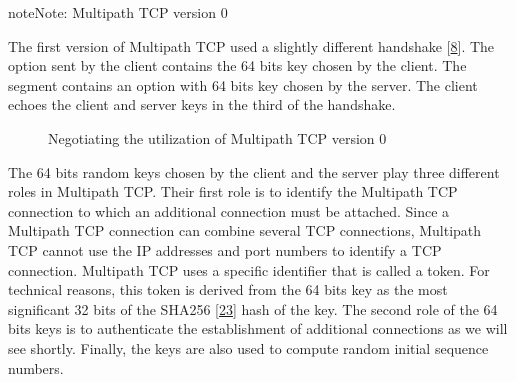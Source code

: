 \documentclass[letterpaper,10pt,english]{sphinxmanual}
\begin{document}
\begin{sphinxadmonition}{note}{Note:}
\sphinxAtStartPar
Multipath TCP version 0

\sphinxAtStartPar
The first version of Multipath TCP used a slightly different handshake {[}\hyperlink{cite.biblio:id6658}{8}{]}. The  option sent by the client contains the 64 bits key chosen by the client. The  segment contains an  option with 64 bits key chosen by the server. The client echoes the client and server keys in the third  of the handshake.
\begin{figure}[H]\centering\capstart{}\caption{Negotiating the utilization of Multipath TCP version 0}\label{\detokenize{mptcp:id64}}\label{\detokenize{mptcp:fig-tcp-handshake-mptcp-v0}}\end{figure}\end{sphinxadmonition}

\sphinxAtStartPar
The 64 bits random keys chosen by the client and the server play three different roles in Multipath TCP. Their first role is to identify the Multipath TCP connection to which an additional connection must be attached. Since a Multipath TCP connection can combine several TCP connections, Multipath TCP cannot use the IP addresses and port numbers to identify a TCP connection. Multipath TCP uses a specific identifier that is called a token. For technical reasons, this token is derived from the 64 bits key as the most significant 32 bits of the SHA\sphinxhyphen{}256 {[}\hyperlink{cite.biblio:id6083}{23}{]} hash of the key. The second role of the 64 bits keys is to authenticate the establishment of additional connections as we will see shortly. Finally, the keys are also used to compute random initial sequence numbers.
\end{document}
